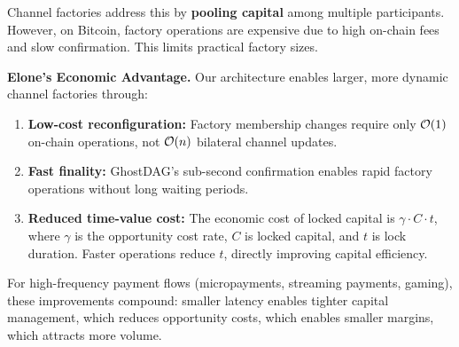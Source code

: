 Channel factories address this by \textbf{pooling capital} among multiple participants. However, on Bitcoin, factory operations are expensive due to high on-chain fees and slow confirmation. This limits practical factory sizes.

\textbf{Elone's Economic Advantage.} Our architecture enables larger, more dynamic channel factories through:
\begin{enumerate}
    \item \textbf{Low-cost reconfiguration:} Factory membership changes require only $\mathcal{O}(1)$ on-chain operations, not $\mathcal{O}(n)$ bilateral channel updates.
    \item \textbf{Fast finality:} GhostDAG's sub-second confirmation enables rapid factory operations without long waiting periods.
    \item \textbf{Reduced time-value cost:} The economic cost of locked capital is $\gamma \cdot C \cdot t$, where $\gamma$ is the opportunity cost rate, $C$ is locked capital, and $t$ is lock duration. Faster operations reduce $t$, directly improving capital efficiency.
\end{enumerate}

For high-frequency payment flows (micropayments, streaming payments, gaming), these improvements compound: smaller latency enables tighter capital management, which reduces opportunity costs, which enables smaller margins, which attracts more volume.
